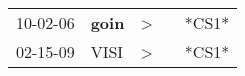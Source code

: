 \begin{supertabular}{p{0.07\textwidth}p{0.06\textwidth}p{0.02\textwidth}p{0.02\textwidth}p{0.06\textwidth}}
 10-02-06\textsuperscript{} &  \textbf{goin\textsuperscript{}} &  \textgreater &   &  *CS1* \\
 02-15-09\textsuperscript{} &           VISI\textsuperscript{} &  \textgreater &   &  *CS1* \\
\end{supertabular}
